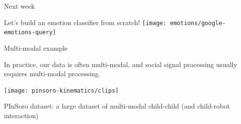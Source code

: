 \documentclass[compress]{beamer}
\begin{document}
\begin{frame}{Next week}
    \begin{center}
        \Large
        Let's build an emotion classifier from scratch!
        \vspace{2cm}
        \texttt{[image: emotions/google-emotions-query]}
    \end{center}
\end{frame}



{

\begin{frame}{Multi-modal example}

    In practice, our data is often multi-modal, and social signal processing
    usually requires multi-modal processing.


    \begin{center}
        \texttt{[image: pinsoro-kinematics/clips]}
    \end{center}

    PInSoro dataset: a large dataset of multi-modal child-child (and child-robot
    interaction)

\end{frame}
}





\end{document}
